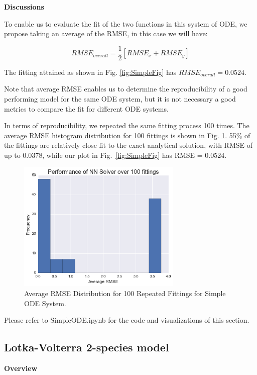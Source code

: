 \documentclass[11pt]{article}
\begin{document}
\textbf{Discussions}

To enable us to evaluate the fit of the two functions in this system of ODE, we propose taking an average of the RMSE, in this case we will have:

\begin{equation}
RMSE_{overall} = \frac{1}{2}[RMSE_{x} + RMSE_{y}]
\end{equation}

The fitting attained as shown in Fig. \ref{fig:SimpleFig} has $RMSE_{overall} = 0.0524$.

Note that average RMSE enables us to determine the reproducibility of a good performing model for the same ODE system, but it is not necessary a good metrics to compare the fit for different ODE systems. 

In terms of reproducibility, we repeated the same fitting process 100 times. The average RMSE histogram distribution for 100 fittings is shown in Fig. \ref{fig:SimpleHistogram}. 55\% of the fittings are relatively close fit to the exact analytical solution, with RMSE of up to 0.0378, while our plot in Fig.~\ref{fig:SimpleFig} has RMSE = 0.0524.

\begin{figure}
\centering
\includegraphics[width=0.7\textwidth]{histogram_simple.png}
      \caption{Average RMSE Distribution for 100 Repeated Fittings for Simple ODE System. \label{fig:SimpleHistogram}}
\end{figure}

Please refer to SimpleODE.ipynb for the code and visualizations of this section.

\subsection{Lotka-Volterra 2-species model}
\textbf{Overview}
\end{document}
